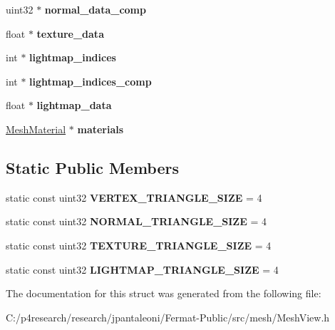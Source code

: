 \begin{DoxyCompactItemize}
uint32 $\ast$ {\bfseries normal\+\_\+data\+\_\+comp}
\item 
\mbox{\label{struct_mesh_view_af5841aa407db1afda0ea9091a45a77f4}} 
float $\ast$ {\bfseries texture\+\_\+data}
\item 
\mbox{\label{struct_mesh_view_a6c5904a0b897a76eb3d02c84caabd694}} 
int $\ast$ {\bfseries lightmap\+\_\+indices}
\item 
\mbox{\label{struct_mesh_view_a67a0c9a5c568543d50f522ded8743aad}} 
int $\ast$ {\bfseries lightmap\+\_\+indices\+\_\+comp}
\item 
\mbox{\label{struct_mesh_view_ae5fadc96e7350d86e43647d0c9b37c61}} 
float $\ast$ {\bfseries lightmap\+\_\+data}
\item 
\mbox{\label{struct_mesh_view_a01037f25f4854a61f84c00b311c4f935}} 
\hyperlink{struct_mesh_material}{Mesh\+Material} $\ast$ {\bfseries materials}
\end{DoxyCompactItemize}
\subsection*{Static Public Members}
\begin{DoxyCompactItemize}
\item 
\mbox{\label{struct_mesh_view_a6f59ead0f10e169321d1a4b68754169c}} 
static const uint32 {\bfseries V\+E\+R\+T\+E\+X\+\_\+\+T\+R\+I\+A\+N\+G\+L\+E\+\_\+\+S\+I\+ZE} = 4
\item 
\mbox{\label{struct_mesh_view_a20a6c2bd559b1c8fccdab6da140b1308}} 
static const uint32 {\bfseries N\+O\+R\+M\+A\+L\+\_\+\+T\+R\+I\+A\+N\+G\+L\+E\+\_\+\+S\+I\+ZE} = 4
\item 
\mbox{\label{struct_mesh_view_a26a9d99c414485205667ddb845ebc9ba}} 
static const uint32 {\bfseries T\+E\+X\+T\+U\+R\+E\+\_\+\+T\+R\+I\+A\+N\+G\+L\+E\+\_\+\+S\+I\+ZE} = 4
\item 
\mbox{\label{struct_mesh_view_a6befda8c973116fb4e0f0c33597df90c}} 
static const uint32 {\bfseries L\+I\+G\+H\+T\+M\+A\+P\+\_\+\+T\+R\+I\+A\+N\+G\+L\+E\+\_\+\+S\+I\+ZE} = 4
\end{DoxyCompactItemize}


The documentation for this struct was generated from the following file\+:\begin{DoxyCompactItemize}
\item 
C\+:/p4research/research/jpantaleoni/\+Fermat-\/\+Public/src/mesh/Mesh\+View.\+h\end{DoxyCompactItemize}
